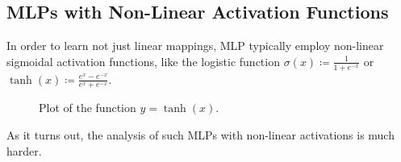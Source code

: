 \documentclass[../../main.tex]{subfiles}
\begin{document}
    \subsection{MLPs with Non-Linear Activation Functions}
    In order to learn not just linear mappings, MLP typically employ non-linear sigmoidal activation functions, like the logistic function $\sigma(x) \coloneqq \frac{1}{1+e^{-x}}$ or $\tanh(x) \coloneqq \frac{e^x - e^{-x}}{e^x + e^{-x}}$.

    \begin{figure}[h]
    \centering
        \caption{Plot of the function $y=\tanh(x)$.}
    \end{figure}

    As it turns out, the analysis of such MLPs with non-linear activations is much harder.
\end{document}
